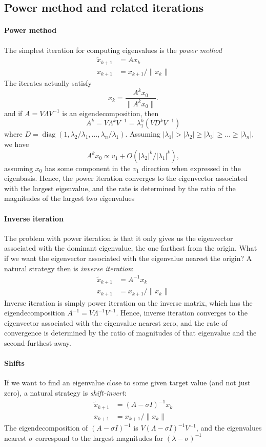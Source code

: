 \documentclass[12pt, leqno]{article}
\begin{document}
\subsection{Power method and related iterations}

\paragraph{Power method}
The simplest iteration for computing eigenvalues is the {\em power
  method}
\begin{align*}
  \tilde{x}_{k+1} &= A x_k \\
  x_{k+1} &= x_{k+1}/\|x_k\|
\end{align*}
The iterates actually satisfy
\[
  x_{k} = \frac{A^k x_0}{\|A^k x_0\|}.
\]
and if $A = V \Lambda V^{-1}$ is an eigendecomposition, then
\[
  A^k = V \Lambda^k V^{-1} = \lambda_1^k (V D^k V^{-1})
\]
where
$D = \operatorname{diag}(1, \lambda_2/\lambda_1, \ldots, \lambda_n/\lambda_1)$.
Assuming $|\lambda_1| > |\lambda_2| \geq |\lambda_3| \geq \ldots \geq
|\lambda_n|$, we have
\[
  A^k x_0 \propto v_1 + O\left( |\lambda_2|^k/|\lambda_1|^k \right),
\]
assuming $x_0$ has some component in the $v_1$ direction when
expressed in the eigenbasis.  Hence, the power iteration converges
to the eigenvector associated with the largest eigenvalue, and the
rate is determined by the ratio of the magnitudes of the largest two
eigenvalues

\paragraph{Inverse iteration}
The problem with power iteration is that it only gives us the
eigenvector associated with the dominant eigenvalue, the one farthest
from the origin.  What if we want the eigenvector associated with the
eigenvalue nearest the origin?  A natural strategy then is {\em
  inverse iteration}:
\begin{align*}
  \tilde{x}_{k+1} &= A^{-1} x_k \\
  x_{k+1} &= x_{k+1}/\|x_k\|
\end{align*}
Inverse iteration is simply power iteration on the inverse matrix,
which has the eigendecomposition $A^{-1} = V \Lambda^{-1} V^{-1}$.
Hence, inverse iteration converges to the eigenvector associated with
the eigenvalue nearest zero, and the rate of convergence is determined
by the ratio of magnitudes of that eigenvalue and the second-furthest-away.

\paragraph{Shifts}
If we want to find an eigenvalue close to some given target value
(and not just zero), a natural strategy is {\em shift-invert}:
\begin{align*}
  \tilde{x}_{k+1} &= (A-\sigma I)^{-1} x_k \\
  x_{k+1} &= x_{k+1}/\|x_k\|
\end{align*}
The eigendecomposition of $(A-\sigma I)^{-1}$ is
$V (\Lambda - \sigma I)^{-1} V^{-1}$, and the eigenvalues
nearest $\sigma$ correspond to the
largest magnitudes for $(\lambda-\sigma)^{-1}$
\end{document}
